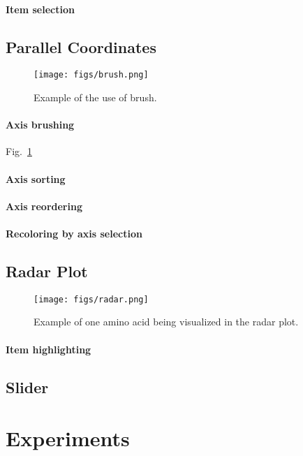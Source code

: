 \documentclass[10pt, conference]{IEEEtran}
\begin{document}
\paragraph*{Item selection}

\subsection{Parallel Coordinates}
\begin{figure}
\texttt{[image: figs/brush.png]}
\caption{Example of the use of brush.} 
\label{fig:brush}
\end{figure}
\paragraph*{Axis brushing} Fig.~\ref{fig:brush}

\paragraph*{Axis sorting}
\paragraph*{Axis reordering}
\paragraph*{Recoloring by axis selection}

\subsection{Radar Plot}
\begin{figure}
\texttt{[image: figs/radar.png]}
\caption{Example of one amino acid being visualized in the radar plot.} 
\label{fig:radar}
\end{figure}
\paragraph*{Item highlighting}

\subsection{Slider}

\section{Experiments}
%
\end{document}
